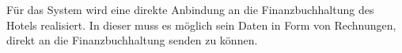 \documentclass[../../Pflichtenheft.tex]{subfiles}
\begin{document}
    Für das System wird eine direkte Anbindung an die Finanzbuchhaltung des Hotels realisiert.
    In dieser muss es möglich sein Daten in Form von Rechnungen, direkt an die Finanzbuchhaltung senden zu können.
\end{document}
